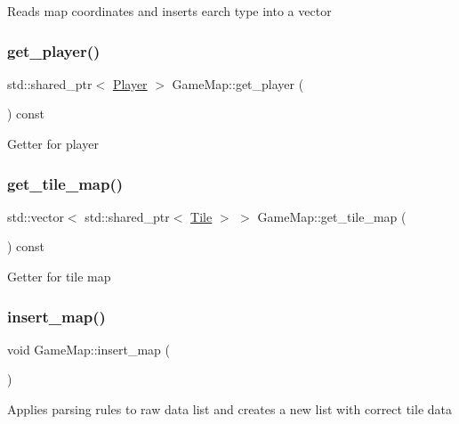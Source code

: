 Reads map coordinates and inserts earch type into a vector \mbox{\label{classGameMap_ada35cb948e4465b29086a6ad4932f6ce}} 
\subsubsection{\texorpdfstring{get\+\_\+player()}{get\_player()}}
{\footnotesize\ttfamily std\+::shared\+\_\+ptr$<$ \hyperlink{classPlayer}{Player} $>$ Game\+Map\+::get\+\_\+player (\begin{DoxyParamCaption}{ }\end{DoxyParamCaption}) const}

Getter for player \mbox{\label{classGameMap_affb1e1429ba687d7a62c5ea4e867c803}} 
\subsubsection{\texorpdfstring{get\+\_\+tile\+\_\+map()}{get\_tile\_map()}}
{\footnotesize\ttfamily std\+::vector$<$ std\+::shared\+\_\+ptr$<$ \hyperlink{classTile}{Tile} $>$ $>$ Game\+Map\+::get\+\_\+tile\+\_\+map (\begin{DoxyParamCaption}{ }\end{DoxyParamCaption}) const}

Getter for tile map \mbox{\label{classGameMap_a9d53ff53fb0a9514620459b61fe3c2a2}} 
\subsubsection{\texorpdfstring{insert\+\_\+map()}{insert\_map()}}
{\footnotesize\ttfamily void Game\+Map\+::insert\+\_\+map (\begin{DoxyParamCaption}{ }\end{DoxyParamCaption})}

Applies parsing rules to raw data list and creates a new list with correct tile data \mbox{\label{classGameMap_a7b2b1eb1706633e48197679314a0f912}} 
